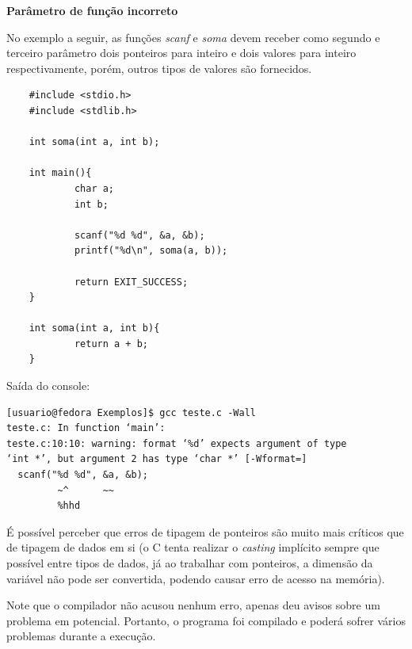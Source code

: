 \documentclass[12pt]{article}
\newcommand\tab[1][1cm]{\hspace*{#1}}
\begin{document}
\hspace{2cm}
\par\tab\textbf{Parâmetro de função incorreto}

\par\tab No exemplo a seguir, as funções \textit{scanf} e \textit{soma} devem receber como segundo e terceiro parâmetro dois ponteiros para inteiro e dois valores para inteiro respectivamente, porém, outros tipos de valores são fornecidos.

\hspace{0.25cm}
\begin{lstlisting}
    #include <stdio.h>
    #include <stdlib.h>
    
    int soma(int a, int b);
    
    int main(){
            char a;
            int b;
    
            scanf("%d %d", &a, &b);
            printf("%d\n", soma(a, b));
    
            return EXIT_SUCCESS;
    }
    
    int soma(int a, int b){
            return a + b;
    }
\end{lstlisting}

\par\tab Saída do console:

\hspace{0.25cm}
\begin{tcolorbox}[colback=black!5!white,colframe=black!75!white,title=Console: usuario@fedora:\~/Exemplos]
    \begin{verbatim}
[usuario@fedora Exemplos]$ gcc teste.c -Wall
teste.c: In function ‘main’:
teste.c:10:10: warning: format ‘%d’ expects argument of type 
‘int *’, but argument 2 has type ‘char *’ [-Wformat=]
  scanf("%d %d", &a, &b);
         ~^      ~~
         %hhd
    \end{verbatim}
\end{tcolorbox}

\par\tab É possível perceber que erros de tipagem de ponteiros são muito mais críticos que de tipagem de dados em si (o C tenta realizar o \textit{casting} implícito sempre que possível entre tipos de dados, já ao trabalhar com ponteiros, a dimensão da variável não pode ser convertida, podendo causar erro de acesso na memória).

\hspace{0.25cm}
\begin{tcolorbox}[colback=yellow!5!white,colframe=yellow!75!black,title=Atenção!]
  \par\tab Note que o compilador não acusou nenhum erro, apenas deu avisos sobre um problema em potencial. Portanto, o programa foi compilado e poderá sofrer vários problemas durante a execução.
\end{tcolorbox}
\end{document}
